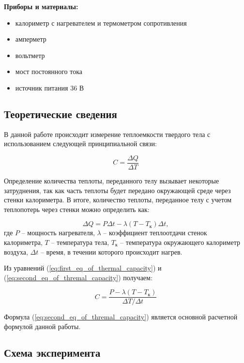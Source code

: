 \documentclass[12pt,a4paper]{article}
\begin{document}
\textbf{Приборы и материалы:}
\begin{itemize}
	\item калориметр с нагревателем и термометром сопротивления
	\item амперметр
	\item вольтметр
	\item мост постоянного тока
	\item источник питания 36 В
\end{itemize}


\subsection{Теоретические сведения}

В данной работе происходит измерение теплоемкости твердого тела с использованием следующей принципиальной связи:
	
	\begin{equation}
		C = \frac{\Delta Q}{\Delta T}
		\label{eq:first_eq_of_thermal_capacity}
	\end{equation}
	
	Определение количества теплоты, переданного телу вызывает некоторые затруднения, так как часть теплоты будет передано окружающей среде через стенки калориметра. В итоге, количество теплоты, переданное телу с учетом теплопотерь через стенки можно определить как:
	
	\begin{equation}
		\Delta Q = P\Delta t - \lambda \left( T - T_{\text{к}} \right) \Delta t,
		\label{eq:termal_with_heat_lossing}
	\end{equation}
	 где $P$ -- мощность нагревателя, $\lambda$ -- коэффициент теплоотдачи стенок калориметра, $T$ -- температура тела, $T_{\text{к}}$ -- температура окружающего калориметр воздуха, $\Delta t$ -- время, в течении которого происходит нагрев.
	 
	 Из уравнений (\ref{eq:first_eq_of_thermal_capacity}) и (\ref{eq:second_eq_of_thremal_capacity}) получаем:
	 
	 \begin{equation}
	 	C = \frac{P - \lambda \left(T - T_{\text{к}} \right) }{\Delta T /\Delta t}
	 	\label{eq:second_eq_of_thremal_capacity}
	 \end{equation}
	 
	Формула (\ref{eq:second_eq_of_thremal_capacity}) является основной расчетной формулой данной работы.
	
\subsection{Схема эксперимента}
\end{document}
